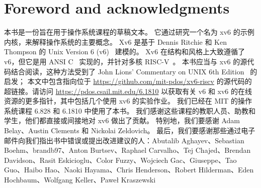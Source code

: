 \chapter*{Foreword and acknowledgments}


本书是一份旨在用于操作系统课程的草稿文本。
它通过研究一个名为 xv6 的示例内核，来解释操作系统的主要概念。
Xv6 是基于 Dennis Ritchie 和 Ken Thompson 的 Unix Version 6 (v6)~\cite{unix} 建模的。
Xv6 在结构和风格上大致遵循了 v6，但它是用 ANSI C~\cite{kernighan} 实现的，并针对多核 RISC-V~\cite{riscv}。
本书应当与 xv6 的源代码结合阅读，这种方法受到了 John Lions' Commentary on UNIX 6th Edition~\cite{lions} 的启发；
本文中包含指向位于 \url{https://github.com/mit-pdos/xv6-riscv} 的源代码的超链接。请访问 \url{https://pdos.csail.mit.edu/6.1810} 以获取有关 v6 和 xv6 的在线资源的更多指针，其中包括几个使用 xv6 的实验作业。
我们已经在 MIT 的操作系统课程 6.828 和 6.1810 中使用了本书。
我们感谢这些课程的教职人员、助教和学生，他们都直接或间接地对 xv6 做出了贡献。
特别地，我们要感谢 Adam Belay、Austin Clements 和 Nickolai Zeldovich。
最后，我们要感谢那些通过电子邮件向我们指出书中错误或提出改进建议的人：Abutalib Aghayev、Sebastian Boehm、brandb97、Anton Burtsev、Raphael Carvalho、Tej Chajed、Brendan Davidson、Rasit Eskicioglu、Color Fuzzy、Wojciech Gac、Giuseppe、Tao Guo、Haibo Hao、Naoki Hayama、Chris Henderson、Robert Hilderman、Eden Hochbaum、Wolfgang Keller、Paweł Kraszewski
